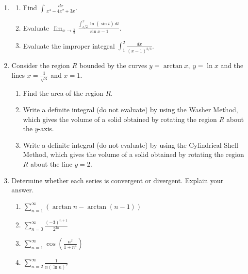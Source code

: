 \documentclass[a4paper, 12pt]{article}
\begin{document}
\begin{enumerate}[leftmargin=*,label=\textbf{\arabic*.}]
\item \begin{enumerate}[leftmargin=*,label=\textbf{\alph*.}]
\item Find $\displaystyle\int\frac{dx}{x^3-4x^2+3x}$.

\item Evaluate $\displaystyle\lim_{x\to\textstyle\frac\pi2}\frac{\displaystyle\int_{\pi/2}^x\ln(\sin t)\,dt}{\sin x-1}$.

\item Evaluate the improper integral  $\displaystyle\int_1^2\frac{dx}{(x-1)^{2/3}}$.
\end{enumerate}

\item Consider the region $R$ bounded by the curves $y=\arctan x,\:y=\ln x$ and the lines $\displaystyle x=\frac1{\sqrt3}$ and $x=1$.

\begin{enumerate}[leftmargin=*,label=\textbf{\alph*.}]
\item Find the area of the region $R$. 

\item Write a definite integral (do not evaluate) by using the Washer Method, which gives the volume of a solid obtained by rotating the region $R$ about the $y$-axis.

\item Write a definite integral (do not evaluate) by using the Cylindrical Shell Method, which gives the volume of a solid obtained by rotating the region $R$ about the line $y=2$.
\end{enumerate}

\item Determine whether each series is convergent or divergent. Explain your answer.
\begin{enumerate}[leftmargin=*,label=\textbf{\alph*.}]
\item $\displaystyle\sum_{n=1}^\infty\left(\arctan n-\arctan(n-1)\right)$
\item $\displaystyle\sum_{n=0}^\infty\frac{(-3)^{n+1}}{2^{3n}}$
\item $\displaystyle\sum_{n=1}^\infty\cos\left(\frac{n^2}{1+n^4}\right)$
\item $\displaystyle\sum_{n=2}^\infty\frac1{n(\ln n)^2}$
\end{enumerate}
\end{enumerate}
\newpage
{}
{}
\end{document}
